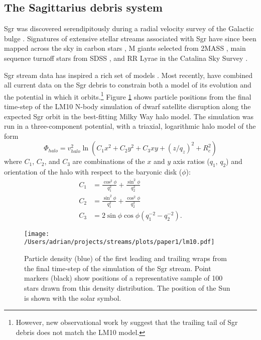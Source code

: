 \documentclass{emulateapj}
\begin{document}
\subsection{The Sagittarius debris system}
\label{sec:sgr}
Sgr was discovered serendipitously during a radial velocity 
survey of the Galactic bulge \citep{ibata94}. 
Signatures of extensive stellar
streams associated with Sgr have since  been
mapped across the sky in carbon stars \citep{totten98}, M giants
selected from 2MASS \citep{majewski03}, main
sequence turnoff stars from SDSS
\citep{belokurov06}, and RR Lyrae in the Catalina Sky Survey
\citep{drake13}. 

Sgr stream data has inspired a rich set of  models 
\citep[e.g.,][]{johnston99b, fellhauer06}.
Most recently, \citet[][hereafter LM10]{law10} have combined all
current data on the Sgr debris to constrain both a model of its evolution
and the potential in which it orbits.\footnote{However, new observational work by 
\cite{belokurov13} suggest that the trailing tail of Sgr debris does not
match the LM10 model.}
Figure \ref{fig:lm10} shows particle positions
from the final time-step of the LM10 N-body
simulation of dwarf satellite disruption along the expected Sgr orbit
in the best-fitting Milky Way halo model. The simulation was
run in a three-component potential, with a triaxial, logarithmic halo
model of the form
\begin{equation}
  \Phi_{halo} = v_{halo}^2 \ln(C_1 x^2 + C_2 y^2 + C_3 xy + (z/q_z)^2 + R_c^2)
\end{equation}
where $C_1$, $C_2$, and $C_3$ are combinations of the $x$ and $y$ axis
ratios ($q_1$, $q_2$) and orientation of the halo with respect to the
baryonic disk ($\phi$):
\begin{align}
  C_1 &= \frac{\cos^2\phi}{q_1^2} + \frac{\sin^2\phi}{q_2^2}\\
  C_2 &= \frac{\sin^2\phi}{q_1^2} + \frac{\cos^2\phi}{q_2^2}\\
  C_3 &= 2\sin\phi\cos\phi \left(q_1^{-2} - q_2^{-2}\right).
\end{align}

\begin{figure}[h]
\begin{center}
\texttt{[image: /Users/adrian/projects/streams/plots/paper1/lm10.pdf]}
\caption{ Particle density (blue) of the first leading and trailing wraps from the final time-step of the \citet{law10} simulation of the Sgr stream. Point markers (black) show positions of a representative sample of 100 stars drawn from this density distribution. The position of the Sun is shown with the solar symbol. }\label{fig:lm10}
\end{center}
\end{figure}
\end{document}
